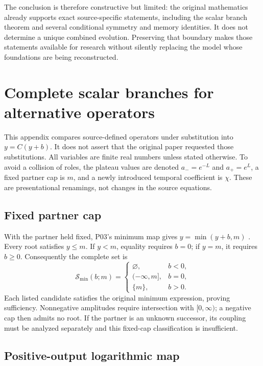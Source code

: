 \documentclass[11pt,a4paper]{article}
\theoremstyle{definition}
\numberwithin{equation}{section}
\begin{document}
The conclusion is therefore constructive but limited: the original
mathematics already supports exact source-specific statements, including
the scalar branch theorem and several conditional symmetry and memory
identities. It does not determine a unique combined evolution. Preserving
that boundary makes those statements available for research without
silently replacing the model whose foundations are being reconstructed.

\appendix
\section{Complete scalar branches for alternative operators}
\label{app:branches}

This appendix compares source-defined operators under substitution into
$y=C(y+b)$. It does not assert that the original paper requested those
substitutions. All variables are finite real numbers unless stated
otherwise. To avoid a collision of roles, the plateau values are denoted
$a_-=e^{-L}$ and $a_+=e^L$, a fixed partner cap is $m$, and a newly
introduced temporal coefficient is $\chi$. These are presentational
renamings, not changes in the source equations.

\subsection{Fixed partner cap}

With the partner held fixed, P03's minimum map gives
$y=\min(y+b,m)$ \cite[physical p.~6, \S2.5]{P03}.
Every root satisfies $y\leq m$.
If $y<m$, equality requires $b=0$; if $y=m$, it requires $b\geq0$.
Consequently the complete set is
\begin{equation}
 \mathcal S_{\min}(b;m)=
 \begin{cases}
 \varnothing,&b<0,\\
 (-\infty,m],&b=0,\\
 \{m\},&b>0.
 \end{cases}
 \label{eq:min-branches}
\end{equation}
Each listed candidate satisfies the original minimum expression, proving
sufficiency. Nonnegative amplitudes require intersection with
$[0,\infty)$; a negative cap then admits no root.
If the partner is an unknown successor, its coupling must be analyzed
separately and this fixed-cap classification is insufficient.

\subsection{Positive-output logarithmic map}
\label{app:positive-log}
\end{document}
